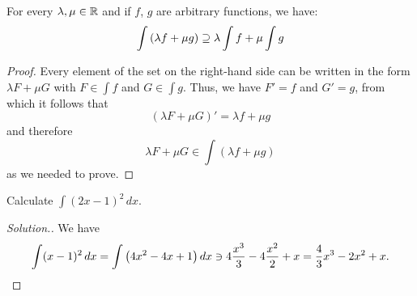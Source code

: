 \begin{theorem}
For every $\lambda,\mu \in {\mathbb R}$ and if $f$, $g$ are arbitrary functions, we
have:
\[
  \int {\left( \lambda f + \mu g \right)} \supseteq \lambda \int f + \mu \int g
\]
\end{theorem}
%
\begin{proof}
Every element of the set on the right-hand side can be written in the form
$\lambda F + \mu G$ with $F\in \int f$ and $G\in \int g$. Thus, we have $F'=f$
and $G'=g$, from which it follows that
\[
  (\lambda F + \mu G)' = \lambda f + \mu g
\]
and therefore
\[
  \lambda F + \mu G \in \int (\lambda f + \mu g)
\]
as we needed to prove.
\end{proof}

\begin{example}\label{ex:234045}
  Calculate $\int (2x-1)^2\, dx$.
\end{example}
\begin{proof}[Solution.]
  We have 
  \[
  \int (x-1)^2\, dx = \int {\left( 4x^2 - 4x +1 \right)}\, dx 
  \ni 4\frac{x^3}{3} - 4 \frac {x^2}{2} + x
  = \frac 4 3 x^3 - 2 x^2 + x.
  \]
\end{proof}


